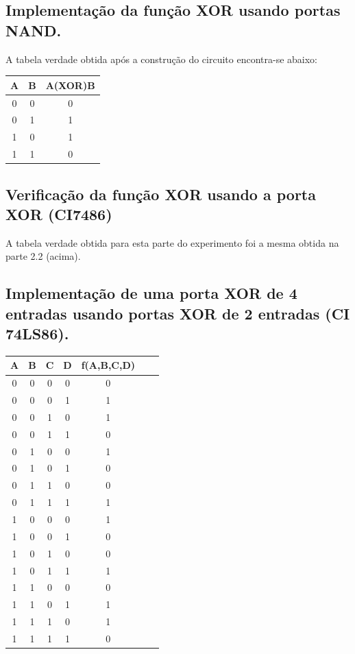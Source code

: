 \documentclass[12pt]{article}
\begin{document}
	\subsection{Implementação da função XOR usando portas NAND.}
	\label{sec:XOR}

	A tabela verdade obtida após a construção do circuito encontra-se abaixo:
	
	\begin{table}[H]
		\centering
		\begin{tabular}{|c|c|c|}
			\cline{1-3}
			\multicolumn{1}{|c|}{A} & \multicolumn{1}{|c|}{B} & \multicolumn{1}{|c|}{A(XOR)B} \\
			\hline
			0 & 0 & 0 \\
			0 & 1 & 1 \\
			1 & 0 & 1 \\
			1 & 1 & 0 \\
			\hline
		\end{tabular}
		\label{Porta NAND}
	\end{table}
	
	\subsection{Verificação da função XOR usando a porta XOR (CI7486)}
	
	A tabela verdade obtida para esta parte do experimento foi a mesma obtida na parte 2.2 (acima).
	
	\subsection{Implementação de uma porta XOR de 4 entradas usando portas XOR de 2 entradas (CI 74LS86).}
	\label{XOR2}
	
	\begin{table}[H]
		\centering
		\begin{tabular}{|c|c|c|c|c|c|c|}
			\cline{1-5}
			\multicolumn{1}{|c|}{A} & \multicolumn{1}{|c|}{B} & \multicolumn{1}{|c|}{C} & \multicolumn{1}{|c|}{D} & \multicolumn{1}{|c|}{f(A,B,C,D)}\\
			\hline
			0 & 0 & 0 & 0 & 0 \\
			0 & 0 & 0 & 1 & 1 \\
			0 & 0 & 1 & 0 & 1 \\
			0 & 0 & 1 & 1 & 0 \\
			0 & 1 & 0 & 0 & 1 \\
			0 & 1 & 0 & 1 & 0 \\
			0 & 1 & 1 & 0 & 0 \\
			0 & 1 & 1 & 1 & 1 \\
			1 & 0 & 0 & 0 & 1 \\
			1 & 0 & 0 & 1 & 0 \\
			1 & 0 & 1 & 0 & 0 \\
			1 & 0 & 1 & 1 & 1 \\
			1 & 1 & 0 & 0 & 0 \\
			1 & 1 & 0 & 1 & 1 \\
			1 & 1 & 1 & 0 & 1 \\
			1 & 1 & 1 & 1 & 0 \\
			\hline
		\end{tabular}
		\label{Porta NAND}
	\end{table}
	
\end{document}
